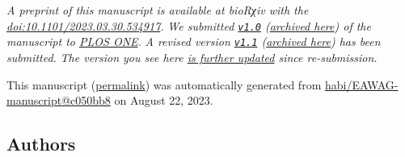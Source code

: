 \emph{A preprint of this manuscript is available at bioRχiv with the \href{https://doi.org/10.1101/2023.03.30.534917}{doi:10.1101/2023.03.30.534917}.}
\emph{We submitted \href{https://github.com/habi/EAWAG-manuscript/releases/tag/v1.0}{\texttt{v1.0}} (\href{https://habi.github.io/EAWAG-manuscript/v/e1e2ef76a476174a4115937d77457037ddec95df/}{archived here}) of the manuscript to \href{https://journals.plos.org/plosone/}{PLOS ONE}.}
\emph{A revised version \href{https://github.com/habi/EAWAG-manuscript/releases/tag/v1.1}{\texttt{v1.1}} (\href{https://habi.github.io/EAWAG-manuscript/v/c49d0b8ac8f078c226318972b06e8c4a39100bb2/}{archived here}) has been submitted.}
\emph{The version you see here \href{https://github.com/habi/EAWAG-manuscript/compare/df99415...c050bb80f13115ddab1a67428d31c5177ce08ee7\#files_bucket}{is further updated} since re-submission.}

This manuscript
(\href{https://habi.github.io/EAWAG-manuscript/v/c050bb80f13115ddab1a67428d31c5177ce08ee7/}{permalink})
was automatically generated
from \href{https://github.com/habi/EAWAG-manuscript/tree/c050bb80f13115ddab1a67428d31c5177ce08ee7}{habi/EAWAG-manuscript@c050bb8}
on August 22, 2023.

\hypertarget{authors}{%
\subsection{Authors}\label{authors}}

